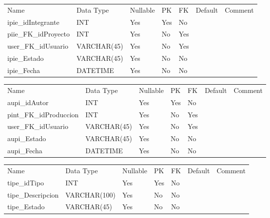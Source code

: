 			\begin{center}
				\begin{tabular}{ |l|l|l|l|l|l|l| }
					\hline
					Name & Data Type & Nullable & PK & FK & Default & Comment \\
					ipie_idIntegrante & INT & Yes & Yes & No &  & \\ \hline 
piie_FK_idProyecto & INT & Yes & No & Yes &  & \\ \hline 
user_FK_idUsuario & VARCHAR(45) & Yes & No & Yes &  & \\ \hline 
ipie_Estado & VARCHAR(45) & Yes & No & No &  & \\ \hline 
ipie_Fecha & DATETIME & Yes & No & No &  & \\ \hline 

				\end{tabular}
			\end{center}
		

			\begin{center}
				\begin{tabular}{ |l|l|l|l|l|l|l| }
					\hline
					Name & Data Type & Nullable & PK & FK & Default & Comment \\
					aupi_idAutor & INT & Yes & Yes & No &  & \\ \hline 
pint_FK_idProduccion & INT & Yes & No & Yes &  & \\ \hline 
user_FK_idUsuario & VARCHAR(45) & Yes & No & Yes &  & \\ \hline 
aupi_Estado & VARCHAR(45) & Yes & No & No &  & \\ \hline 
aupi_Fecha & DATETIME & Yes & No & No &  & \\ \hline 

				\end{tabular}
			\end{center}
		

			\begin{center}
				\begin{tabular}{ |l|l|l|l|l|l|l| }
					\hline
					Name & Data Type & Nullable & PK & FK & Default & Comment \\
					tipe_idTipo & INT & Yes & Yes & No &  & \\ \hline 
tipe_Descripcion & VARCHAR(100) & Yes & No & No &  & \\ \hline 
tipe_Estado & VARCHAR(45) & Yes & No & No &  & \\ \hline 

				\end{tabular}
			\end{center}
		

